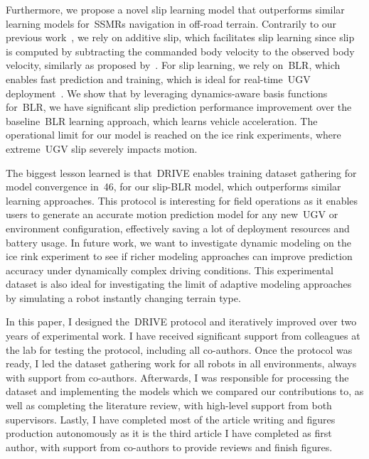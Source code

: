 \documentclass[12pt,letterpaper,oneside]{article}
\begin{document}
Furthermore, we propose a novel slip learning model that outperforms similar learning models for~\acp{SSMR} navigation in off-road terrain.
Contrarily to our previous work~\citep{Baril2020}, we rely on additive slip, which facilitates slip learning since slip is computed by subtracting the commanded body velocity to the observed body velocity, similarly as proposed by~\citet{Seegmiller2014}.
For slip learning, we rely on~\ac{BLR}, which enables fast prediction and training, which is ideal for real-time~\ac{UGV} deployment~\citep{Mckinnon2019}.
We show that by leveraging dynamics-aware basis functions for~\ac{BLR}, we have significant slip prediction performance improvement over the baseline~\ac{BLR} learning approach, which learns vehicle acceleration.
The operational limit for our model is reached on the ice rink experiments, where extreme~\ac{UGV} slip severely impacts motion.

The biggest lesson learned is that~\ac{DRIVE} enables training dataset gathering for model convergence in~\SI{46}{\sec}, for our slip-\ac{BLR} model, which outperforms similar learning approaches.
This protocol is interesting for field operations as it enables users to generate an accurate motion prediction model for any new~\ac{UGV} or environment configuration, effectively saving a lot of deployment resources and battery usage.
In future work, we want to investigate dynamic modeling on the ice rink experiment to see if richer modeling approaches can improve prediction accuracy under dynamically complex driving conditions.
This experimental dataset is also ideal for investigating the limit of adaptive modeling approaches by simulating a robot instantly changing terrain type.

In this paper, I designed the~\ac{DRIVE} protocol and iteratively improved over two years of experimental work.
I have received significant support from colleagues at the lab for testing the protocol, including all co-authors.
Once the protocol was ready, I led the dataset gathering work for all robots in all environments, always with support from co-authors.
Afterwards, I was responsible for processing the dataset and implementing the models which we compared our contributions to, as well as completing the literature review, with high-level support from both supervisors.
Lastly, I have completed most of the article writing and figures production autonomously as it is the third article I have completed as first author, with support from co-authors to provide reviews and finish figures.
\\ \\
	\textbf{}
\end{document}
